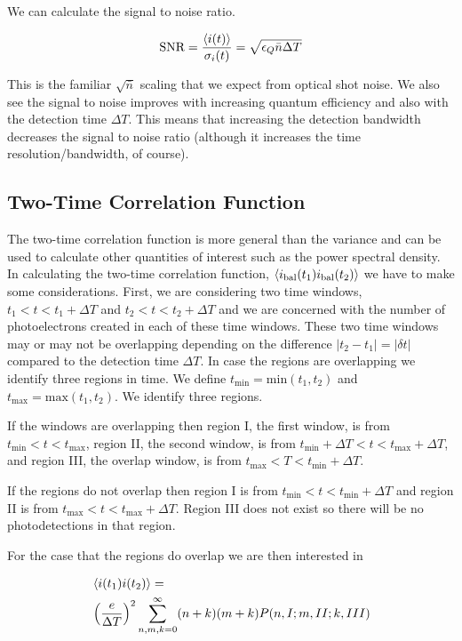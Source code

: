 \documentclass[12pt]{article}
\newcommand{\ep}{\epsilon}
\begin{document}
 We can calculate the signal to noise ratio.

\begin{align}
\label{SNR}
\text{SNR} = \frac{\Braket{i(t)}}{\sigma_i(t)} = \sqrt{\ep_Q \bar{n} \Delta T}
\end{align}

This is the familiar $\sqrt{\bar{n}}$ scaling that we expect from optical shot noise. We also see the signal to noise improves with increasing quantum efficiency and also with the detection time $\Delta T$. This means that increasing the detection bandwidth decreases the signal to noise ratio (although it increases the time resolution/bandwidth, of course).

\subsection{Two-Time Correlation Function}

The two-time correlation function is more general than the variance and can be used to calculate other quantities of interest such as the power spectral density. In calculating the two-time correlation function, $\Braket{i_{\text{bal}}(t_1)i_{\text{bal}}(t_2)}$ we have to make some considerations. First, we are considering two time windows, $t_1<t<t_1+\Delta T$ and $t_2<t<t_2+\Delta T$ and we are concerned with the number of photoelectrons created in each of these time windows. These two time windows may or may not be overlapping depending on the difference $|t_2-t_1|=|\delta t|$ compared to the detection time $\Delta T$. In case the regions are overlapping we identify three regions in time. We define $t_{\text{min}} = \text{min}(t_1,t_2)$ and $t_{\text{max}} = \text{max}(t_1,t_2)$. We identify three regions. 

If the windows are overlapping then region I, the first window, is from $t_{\text{min}}<t<t_{\text{max}}$, region II, the second window, is from $t_{\text{min}}+\Delta T<t<t_{\text{max}}+\Delta T$, and region III, the overlap window, is from $t_{\text{max}} < T < t_{\text{min}}+\Delta T$.

If the regions do not overlap then region I is from $t_{\text{min}}<t<t_{\text{min}}+\Delta T$ and region II is from $t_{\text{max}}<t<t_{\text{max}}+\Delta T$. Region III does not exist so there will be no photodetections in that region.

For the case that the regions do overlap we are then interested in

\begin{align}
\label{twotime}
&\Braket{i(t_1)i(t_2)} =\\
&\left(\frac{e}{\Delta T}\right)^2 \sum_{n,m,k=0}^{\infty} (n+k)(m+k)P(n,I;m,II;k,III)
\end{align}
\end{document}
